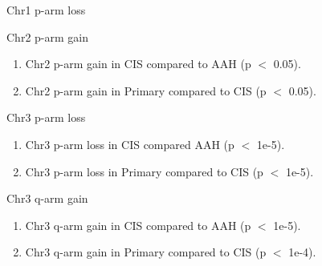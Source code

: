 \documentclass{beamer}
\begin{document}
\begin{frame}[allowframebreaks]
\begin{block}{Chr1 p-arm loss}
                    \begin{table}
                        \caption{CGC Tier1 genes in Chr1 p-arm}
                        \resizebox{\linewidth}{!}
                        {}
                    \end{table}
                \end{block}

                \begin{block}{Chr2 p-arm gain}
                    \begin{enumerate}
                        \item Chr2 p-arm gain in CIS compared to AAH (p $<$ 0.05).
                        \item Chr2 p-arm gain in Primary compared to CIS (p $<$ 0.05).
                    \end{enumerate}

                    \begin{table}
                        \caption{CGC Tier1 genes in Chr2 p-arm}
                        \resizebox{\linewidth}{!}
                        {}
                    \end{table}
                \end{block}

                \begin{block}{Chr3 p-arm loss}
                    \begin{enumerate}
                        \item Chr3 p-arm loss in CIS compared AAH (p $<$ 1e-5).
                        \item Chr3 p-arm loss in Primary compared to CIS (p $<$ 1e-5).
                    \end{enumerate}

                    \begin{table}
                        \caption{CGC Tier1 genes in Chr3 p-arm}
                        \resizebox{\linewidth}{!}
                        {}
                    \end{table}
                \end{block}

                \begin{block}{Chr3 q-arm gain}
                    \begin{enumerate}
                        \item Chr3 q-arm gain in CIS compared to AAH (p $<$ 1e-5).
                        \item Chr3 q-arm gain in Primary compared to CIS (p $<$ 1e-4).
                    \end{enumerate}


\end{block}
\end{frame}
\end{document}
